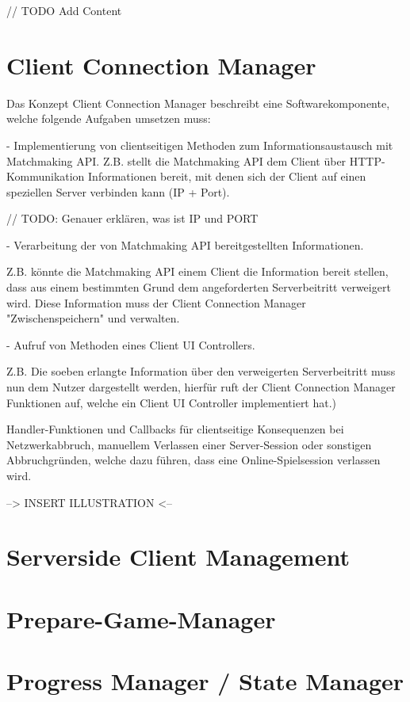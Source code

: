 // TODO Add Content

\section{Client Connection Manager}

Das Konzept Client Connection Manager beschreibt eine Softwarekomponente, welche folgende Aufgaben umsetzen muss:

- Implementierung von clientseitigen Methoden zum Informationsaustausch mit Matchmaking API.
Z.B. stellt die Matchmaking API dem Client über HTTP-Kommunikation Informationen bereit, mit denen sich der Client auf einen speziellen Server verbinden kann (IP + Port).

// TODO: Genauer erklären, was ist IP und PORT

- Verarbeitung der von Matchmaking API bereitgestellten Informationen. 

Z.B. könnte die Matchmaking API einem Client die Information bereit stellen, dass aus einem bestimmten Grund dem angeforderten Serverbeitritt verweigert wird. Diese Information muss der Client Connection Manager "Zwischenspeichern" und verwalten.

- Aufruf von Methoden eines Client UI Controllers.

Z.B. Die soeben erlangte Information über den verweigerten Serverbeitritt muss nun dem Nutzer dargestellt werden, hierfür ruft der Client Connection Manager Funktionen auf, welche ein Client UI Controller implementiert hat.)

Handler-Funktionen und Callbacks für clientseitige Konsequenzen bei Netzwerkabbruch, manuellem Verlassen einer Server-Session oder sonstigen Abbruchgründen, welche dazu führen, dass eine Online-Spielsession verlassen wird.

--> INSERT ILLUSTRATION <--

\section{Serverside Client Management}

\section{Prepare-Game-Manager}


\section{Progress Manager / State Manager}

